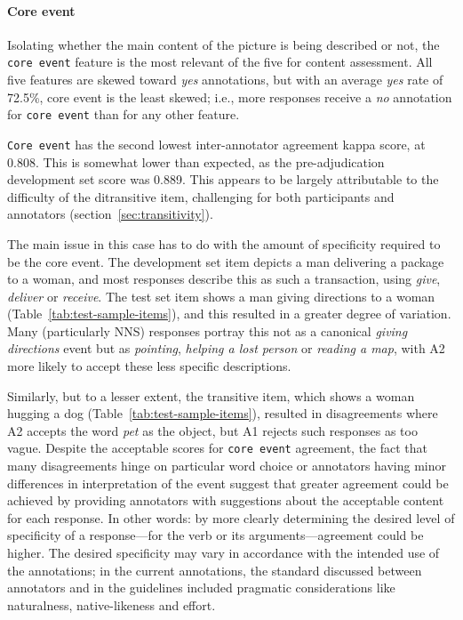 \documentclass[11pt,a4paper]{article}
\newcommand{\feat}[1]{\texttt{#1}}
\newcommand{\md}[1]{\marginpar{\scriptsize MD: #1}}
\newcommand{\lk}[1]{\marginpar{\scriptsize LK: #1}}
\begin{document}
\paragraph{Core event} Isolating whether the main content of the picture is being described or not, the \feat{core event} feature is the most relevant of the five for content assessment. All five features are skewed toward \textit{yes} annotations, but with an average \textit{yes} rate of 72.5\%, core event is the least skewed; i.e., more responses receive a \textit{no} annotation for \feat{core event} than for any other feature.

\feat{Core event} has the second lowest inter-annotator agreement kappa score, at 0.808. This is somewhat lower than expected, as the pre-adjudication development set score was 0.889. This appears to be largely attributable to the difficulty of the ditransitive item, challenging for both participants and annotators (section~\ref{sec:transitivity}). 

The main issue in this case has to do with the amount of specificity required to be the core event.  The development set item depicts a man delivering a package to a woman, and most responses describe this as such a transaction, using \textit{give}, \textit{deliver} or \textit{receive}. The test set item shows a man giving directions to a woman (Table~\ref{tab:test-sample-items}), and this resulted in a greater degree of variation. Many  (particularly NNS) responses portray this not as a canonical \textit{giving directions} event but as \textit{pointing}, 
\textit{helping a lost person} or \textit{reading a map}, with A2 more likely to accept these less specific descriptions.

Similarly, but to a lesser extent, the transitive item, which shows a woman hugging a dog (Table~\ref{tab:test-sample-items}), resulted in disagreements where A2 accepts the word \textit{pet} as the object, but A1 rejects such responses as too vague. Despite the acceptable scores for \feat{core event} agreement, the fact that many disagreements hinge on particular word choice or annotators having minor differences in interpretation of the event suggest that greater agreement could be achieved by providing annotators with suggestions about the acceptable content for each response. In other words: by more clearly determining the desired level of specificity of a response---for the verb or its arguments---agreement could be higher. The desired specificity may vary in accordance with the intended use of the annotations; in the current annotations, the standard discussed between annotators and in the guidelines included pragmatic considerations like naturalness, native-likeness and effort.
\end{document}
